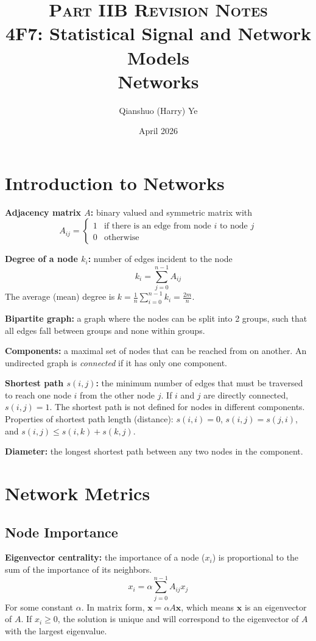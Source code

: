 \documentclass[12pt]{article}
\title{
    {\scshape  Part IIB Revision Notes} \\ 
    \vspace{0.5em}
    \textbf{4F7: Statistical Signal and Network Models} \\ 
    Networks}
\author{Qianshuo (Harry) Ye}
\date{April 2026}
\begin{document}
\maketitle

\section{Introduction to Networks}
\textbf{Adjacency matrix $A$:} binary valued and symmetric matrix with
$$A_{ij} =
\begin{cases}
1 & \text{if there is an edge from node $i$ to node $j$} \\
0 & \text{otherwise}
\end{cases}
$$

\textbf{Degree of a node $k_i$:} number of edges incident to the node
$$k_i = \sum_{j=0}^{n-1} A_{ij}$$
The average (mean) degree is $k = \frac{1}{n} \sum_{i=0}^{n-1} k_i = \frac{2m}{n}$.

\textbf{Bipartite graph:} a graph where the nodes can be split into 2 groups, such that all edges fall between groups and none within groups.

\textbf{Components:} a maximal set of nodes that can be reached from on another. An undirected graph is \textit{connected} if it has only one component.

\textbf{Shortest path $s(i,j)$:} the minimum number of edges that must be traversed to reach one node $i$ from the other node $j$. If $i$ and $j$ are directly connected, $s(i,j) = 1$. The shortest path is not defined for nodes in different components. Properties of shortest path length (distance): $s(i,i) = 0$, $s(i, j) = s(j, i)$, and $s(i, j) \leq s(i, k) + s(k, j)$.

\textbf{Diameter:} the longest shortest path between any two nodes in the component.

\section{Network Metrics}
\subsection{Node Importance}
\textbf{Eigenvector centrality:} the importance of a node ($x_i$) is proportional to the sum of the importance of its neighbors.
$$x_i = \alpha \sum_{j=0}^{n-1} A_{ij} x_j$$ For some constant $\alpha$. In matrix form, $\boldsymbol{x} = \alpha A \boldsymbol{x}$, which means $\boldsymbol{x}$ is an eigenvector of $A$. If $x_i \geq 0$, the solution is unique and will correspond to the eigenvector of $A$ with the largest eigenvalue.
\end{document}
